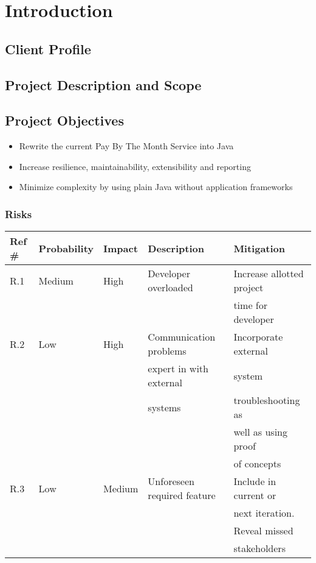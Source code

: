 \section{Introduction}
\subsection{Client Profile}


\subsection{Project Description and Scope}

\subsection{Project Objectives}
\label{Project Objectives}
\begin{itemize}
\item Rewrite the current Pay By The Month Service into Java
\item Increase resilience, maintainability, extensibility and reporting
\item Minimize complexity by using plain Java without application frameworks
\end{itemize}

\subsubsection{Risks}

\begin{tabular}{|l|l|l|l|l|}
\hline
{\bf Ref \#} & {\bf Probability} & {\bf Impact} & {\bf Description} & {\bf Mitigation} \\
\hline
R.1 & Medium & High & Developer overloaded & Increase allotted project \\ & & & & time for developer \\
\hline
R.2 & Low & High & Communication problems & Incorporate external  \\  & & & expert in with external & system \\  & & & systems & troubleshooting as \\ & & & & well as using  proof \\ & & & &  of concepts \\ 
\hline
R.3 & Low & Medium & Unforeseen required feature & Include in current or \\ & & & &  next iteration. \\ & & & & Reveal missed \\ & & & & stakeholders \\
\hline
\end{tabular}

